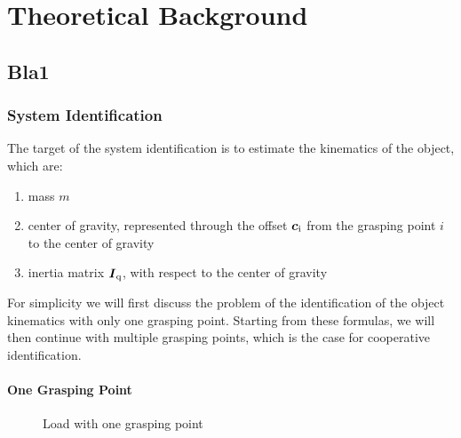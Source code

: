 

\chapter{Theoretical Background}

\section{Bla1}
\label{sec:bla1}
\lipsum[1] 

\subsection{System Identification}
\label{subsec:system_identification}
The target of the system identification is to estimate the kinematics of the object, which are:
\begin{enumerate}
	\item mass $m$
	\item center of gravity, represented through the offset $\boldsymbol{c}_{\mathrm{i}}$ from the grasping point $i$ to the center of gravity
	\item inertia matrix $\boldsymbol{I}_{\mathrm{q}}$, with respect to the center of gravity
\end{enumerate}

For simplicity we will first discuss the problem of the identification of the object kinematics with only one grasping point. Starting from these formulas, we will then continue with multiple grasping points, which is the case for cooperative identification.

\subsubsection{One Grasping Point}

\begin{figure}
	\centering
	
	\caption{Load with one grasping point}
	\label{fig:load_one_grasping_point}
\end{figure}

